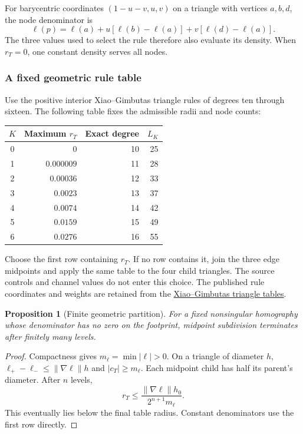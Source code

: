 \documentclass[journal]{IEEEtran}
\newtheorem{proposition}{Proposition}
\begin{document}
For barycentric coordinates $(1-u-v,u,v)$ on a triangle with vertices
$a,b,d$, the node denominator is
\begin{equation}
 \ell(p)=\ell(a)+u[\ell(b)-\ell(a)]+v[\ell(d)-\ell(a)].
 \label{eq:stardenominatorreuse}
\end{equation}
The three values used to select the rule therefore also evaluate its density.
When $r_T=0$, one constant density serves all nodes.

\subsubsection{A fixed geometric rule table}
Use the positive interior Xiao--Gimbutas triangle rules of degrees ten through
sixteen. The following table fixes the admissible radii and node counts:
\begin{center}
\small
\begin{tabular}{c r r r}
$K$ & Maximum $r_T$ & Exact degree & $L_K$ \\
\hline
0 & $0$ & 10 & 25 \\
1 & $0.000009$ & 11 & 28 \\
2 & $0.00036$ & 12 & 33 \\
3 & $0.0023$ & 13 & 37 \\
4 & $0.0074$ & 14 & 42 \\
5 & $0.0159$ & 15 & 49 \\
6 & $0.0276$ & 16 & 55
\end{tabular}
\end{center}
Choose the first row containing $r_T$. If no row contains it, join the three
edge midpoints and apply the same table to the four child triangles.
The source controls and channel values do not enter this choice. The
published rule coordinates and weights are retained from the
\href{https://github.com/zgimbutas/triasymq/tree/25a42d3287118cd9064b57de457947fb937691a9}
{Xiao--Gimbutas triangle tables}.

\begin{proposition}[Finite geometric partition]
For a fixed nonsingular homography whose denominator has no zero on the
footprint, midpoint subdivision terminates after finitely many levels.
\end{proposition}
\begin{proof}
Compactness gives $m_\ell=\min|\ell|>0$. On a triangle of diameter $h$,
$\ell_+-\ell_-\leq\|\nabla\ell\|h$ and $|c_T|\geq m_\ell$.
Each midpoint child has half its parent's diameter. After $n$ levels,
\begin{equation}
 r_T\leq\frac{\|\nabla\ell\|h_0}{2^{n+1}m_\ell}.
\end{equation}
This eventually lies below the final table radius. Constant denominators
use the first row directly.
\end{proof}
\end{document}
